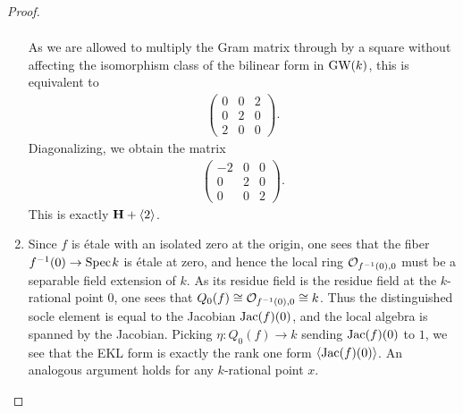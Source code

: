 \documentclass[english]{article}
\begin{document}
\begin{proof}
\begin{enumerate}
\begin{align*}
    \end{align*}
    As we are allowed to multiply the Gram matrix through by a square without affecting the isomorphism class of the bilinear form in $\text{GW}(k)$, this is equivalent to
    \begin{align*}
        \begin{pmatrix} 0 & 0 & 2 \\ 0 & 2 & 0 \\ 2 & 0 & 0 \end{pmatrix}.
    \end{align*}
    Diagonalizing, we obtain the matrix
    \begin{align*}
        \begin{pmatrix} -2 & 0 & 0 \\ 0 & 2 & 0 \\ 0 & 0 & 2 \end{pmatrix}.
    \end{align*}
    This is exactly $\textbf{H} + \left\langle 2 \right\rangle$.


    \item Since $f$ is \'etale with an isolated zero at the origin, one sees that the fiber $f^{-1}(0) \to \text{Spec}\hspace{0.1em} k$ is \'etale at zero, and hence the local ring $\mathcal{O}_{f^{-1}(0),0}$ must be a separable field extension of $k$. As its residue field is the residue field at the $k$-rational point $0$, one sees that $Q_0(f) \cong \mathcal{O}_{f^{-1}(0),0} \cong k$. Thus the distinguished socle element is equal to the Jacobian $\text{Jac}(f)(0)$, and the local algebra is spanned by the Jacobian. Picking $\eta : Q_0(f) \to k$ sending $\text{Jac}(f)(0)$ to $1$, we see that the EKL form is exactly the rank one form $\left\langle \text{Jac}(f)(0) \right\rangle$. An analogous argument holds for any $k$-rational point $x$.
    
    
    \end{enumerate}

\end{proof}
\end{document}
